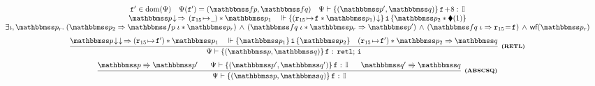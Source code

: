 \begin{figure*}[!t]
{\begin{minipage}{1\textwidth}
\[\begin{array}{c}
{                    }
                    {
                        \begin{array}{c}
                            \lab{}' \in \dom(\Cspec) \quad
                            \Cspec (\lab{}') = (\relspecpre, \relspecpost) \quad
                            \wdcblk{\Cspec}{\relastP'}
                                {\relastQ}{\lab{}\!+\!8}{\cblk} \\
                            \nxtAst{\relastP} \,\Rightarrow\,
                                (\regst{\reg{15}}{\notCare})
                                    * \relastP_1
                            \quad
                            \relwfins{\asrttm{(\regst{\reg{15}}{\lab{}} * \relastP_1)}}
                            {\simplins}{\relastP_2 \sepstar \metricAst{1}}  \\
                            \exists  \lgvl, \relastP_r. \;
                            \supimpl{\relastP_2}{\relastP'}
                                {\relspecpre \; \lgvl * \relastP_r}
                                {\relspecpost \; \lgvl * \relastP_r} \, \wedge \,
                            (\relspecpost \; \lgvl \Rightarrow \reg{15} \!=\! \lab{})
                            \,\land\,\wfFrm(\relastP_r)
                        \end{array}	
                    } \\
                    \\[-5pt]
                    \infer[\tinybftext{(RETL)}]
                    {
                        \wdcblk{\Cspec}{\relastP}{\relastQ}{\lab{}}{\retl; \, \simplins}
                    }
                    {
                        \nxtAst{\nxtAst{\relastP}} \,\Rightarrow
                        (\regst\RAreg{\lab{}'}) \sepstar \relastP_1
                        \quad
                        \relwfins{\relastP_1}{\simplins}{\relastP_2}
                        \quad
                        (\regst\RAreg{\lab{}'}) \sepstar 
                                    \relastP_2 \Rightarrow \relastQ
                    } \\
                    \\[-5pt]
                    \infer[\tinybftext{(ABSCSQ)}]
                    {
                        \wdcblk{\Cspec}{\relastP}{\relastQ}
                            {\lab{}}{\cblk}
                    }
                    {
                        \absExec{\relastP}{\relastP'} \quad \ \ 
                        \wdcblk{\Cspec}{\relastP'}{\relastQ'}
                            {\lab{}}{\cblk} 
                        \quad \ \ 
                        \absExec{\relastQ'}{\relastQ}
                    }
                \end{array}
            \]
        \end{minipage}
    }


\end{figure*}
